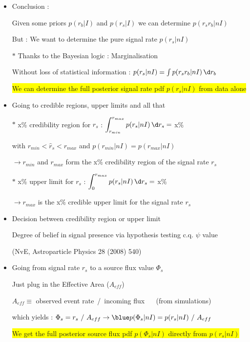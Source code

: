 \Tr
\begin{itemize}
\item Conclusion :
\item[] {\blue Given some priors $p(r_{b}|I)$ and $p(r_{s}|I)$ we can determine $p(r_{s}r_{b}|nI)$}
\item[] But : {\red We want to determine the pure signal rate $p(r_{s}|nI)$}
\item[$\ast$] Thanks to the Bayesian logic : {\blue Marginalisation}
\item[] Without loss of statistical information : {\blue $p(r_{s}|nI)=\int p(r_{s}r_{b}|nI)\,\d r_{b}$}
\item[] \colorbox{yellow}{We can determine the full posterior signal rate pdf $p(r_{s}|nI)$ from data alone}
\item {\blue Going to credible regions, upper limits and all that}
\item[$\ast$] x\% credibility region for $r_{s}$ : $\displaystyle \int_{r_{min}}^{r_{max}} p(r_{s}|nI)\,\d r_{s}=$ x\%
\item[] with $r_{min} < \hat{r}_{s} < r_{max}$ and $p(r_{min}|nI)=p(r_{max}|nI)$ 
\item[] $\rightarrow r_{min}$ and $r_{max}$ form the x\% credibility region of the signal rate $r_{s}$
\item[$\ast$] x\% upper limit for $r_{s}$ : $\displaystyle \int_{0}^{r_{max}} p(r_{s}|nI)\,\d r_{s}=$ x\%
\item[] $\rightarrow r_{max}$ is the x\% credible upper limit for the signal rate $r_{s}$
\end{itemize}

\Tr
\begin{itemize}
\item {\blue Decision between credibility region or upper limit}
\item[] Degree of belief in signal presence via hypothesis testing c.q. $\psi$ value
\item[] (NvE, Astroparticle Physics 28 (2008) 540)
\item {\blue Going from signal rate $r_{s}$ to a source flux value $\Phi_{s}$}
\item[] Just plug in the {\red Effective Area} ($A_{eff}$)
\item[] $A_{eff} \equiv$ observed event rate~/~incoming flux $\quad$ (from simulations)
\item[] which yields : $\Phi_{s}=r_{s}~/~A_{eff} \rightarrow {\blue p(\Phi_{s}|nI)=p(r_{s}|nI)~/~A_{eff}}$
\item[] \colorbox{yellow}{We get the full posterior source flux pdf $p(\Phi_{s}|nI)$ directly from $p(r_{s}|nI)$}
\end{itemize}
